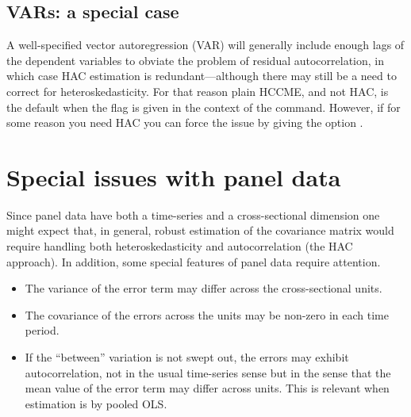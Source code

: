 \subsection{VARs: a special case}
\label{sec:hac-VARs}

A well-specified vector autoregression (VAR) will generally include
enough lags of the dependent variables to obviate the problem of
residual autocorrelation, in which case HAC estimation is
redundant---although there may still be a need to correct for
heteroskedasticity. For that reason plain HCCME, and not HAC, is the
default when the  flag is given in the context of the
 command. However, if for some reason you need HAC you can
force the issue by giving the option .


\section{Special issues with panel data}
\label{sec:vcv-panel}

Since panel data have both a time-series and a cross-sectional
dimension one might expect that, in general, robust estimation of the
covariance matrix would require handling both heteroskedasticity and
autocorrelation (the HAC approach).  In addition, some special features of
panel data require attention.
\begin{itemize}
\item The variance of the error term may differ across the
  cross-sectional units.
\item The covariance of the errors across the units may be non-zero in
  each time period.
\item If the ``between'' variation is not swept out, the errors may
  exhibit autocorrelation, not in the usual time-series sense but in
  the sense that the mean value of the error term may differ across
  units.  This is relevant when estimation is by pooled OLS.
\end{itemize}

